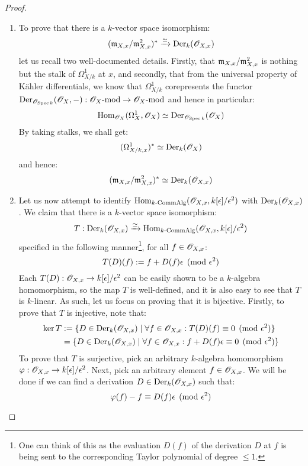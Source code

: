 \begin{proof}
                    \begin{enumerate}
                        \item To prove that there is a $k$-vector space isomorphism:
                            $$(\mathfrak{m}_{X, x}/\mathfrak{m}_{X, x}^2)^* \xrightarrow[]{\simeq} \mathrm{Der}_k(\mathscr{O}_{X, x})$$
                        let us recall two well-documented details. Firstly, that $\mathfrak{m}_{X, x}/\mathfrak{m}_{X, x}^2$ is nothing but the stalk of $\Omega^1_{X/k}$ at $x$, and secondly, that from the universal property of K\"ahler differentials, we know that $\Omega^1_{X/k}$ corepresents the functor $\mathrm{Der}_{\mathscr{O}_{\operatorname{Spec} k}}(\mathscr{O}_X, -): \mathscr{O}_X\text{-}\mathrm{mod} \to \mathscr{O}_X\text{-}\mathrm{mod}$ and hence in particular:
                            $$\mathrm{Hom}_{\mathscr{O}_X}(\Omega^1_X, \mathscr{O}_X) \simeq \mathrm{Der}_{\mathscr{O}_{\operatorname{Spec} k}}(\mathscr{O}_X)$$
                        By taking stalks, we shall get:
                            $$( \Omega^1_{X/k, x} )^* \simeq \mathrm{Der}_k(\mathscr{O}_X)$$
                        and hence:
                            $$(\mathfrak{m}_{X, x}/\mathfrak{m}_{X, x}^2)^* \simeq \mathrm{Der}_k(\mathscr{O}_{X, x})$$
                        \item Let us now attempt to identify $\mathrm{Hom}_{k\text{-}\mathrm{Comm}\mathrm{Alg}}(\mathscr{O}_{X, x}, k[\epsilon]/\epsilon^2)$ with $\mathrm{Der}_k(\mathscr{O}_{X, x})$. We claim that there is a $k$-vector space isomorphism:
                            $$T: \mathrm{Der}_k(\mathscr{O}_{X, x}) \xrightarrow[]{\simeq} \mathrm{Hom}_{k\text{-}\mathrm{Comm}\mathrm{Alg}}(\mathscr{O}_{X, x}, k[\epsilon]/\epsilon^2)$$
                        specified in the following manner\footnote{One can think of this as the evaluation $D(f)$ of the derivation $D$ at $f$ is being sent to the corresponding Taylor polynomial of degree $\leq 1$.}, for all $f \in \mathscr{O}_{X, x}$:
                            $$T(D)(f) := f + D(f)\epsilon \pmod{\epsilon^2}$$
                        Each $T(D): \mathscr{O}_{X, x} \to k[\epsilon]/\epsilon^2$ can be easily shown to be a $k$-algebra homomorphism, so the map $T$ is well-defined, and it is also easy to see that $T$ is $k$-linear. As such, let us focus on proving that it is bijective. Firstly, to prove that $T$ is injective, note that:
                            $$
                                \begin{aligned}
                                    \ker T & := \{ D \in \mathrm{Der}_k(\mathscr{O}_{X, x}) \mid \forall f \in \mathscr{O}_{X, x}: T(D)(f) \equiv 0 \pmod{\epsilon^2}\}
                                    \\
                                    & = \{ D \in \mathrm{Der}_k(\mathscr{O}_{X, x}) \mid \forall f \in \mathscr{O}_{X, x}: f + D(f)\epsilon \equiv 0 \pmod{\epsilon^2}\}
                                \end{aligned}
                            $$
                        To prove that $T$ is surjective, pick an arbitrary $k$-algebra homomorphism $\varphi: \mathscr{O}_{X, x} \to k[\epsilon]/\epsilon^2$. Next, pick an arbitrary element $f \in \mathscr{O}_{X, x}$. We will be done if we can find a derivation $D \in \mathrm{Der}_k(\mathscr{O}_{X, x})$ such that:
                            $$\varphi(f) - f \equiv D(f) \epsilon \pmod{\epsilon^2}$$
                    \end{enumerate}
                \end{proof}

